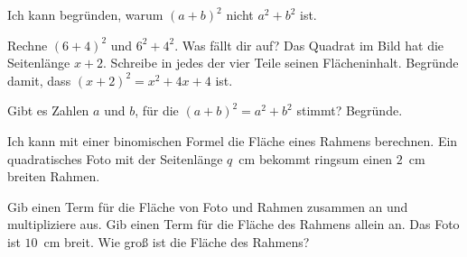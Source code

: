 \begin{aufgabe}{Ich kann begründen, warum $(a + b)^2$ nicht $a^2 + b^2$ ist.}
\begin{teile}
\teil Rechne $(6 + 4)^2$ und $6^2 + 4^2$. Was fällt dir auf?
\teil Das Quadrat im Bild hat die Seitenlänge $x + 2$. Schreibe in jedes der vier Teile seinen Flächeninhalt. Begründe damit, dass $(x + 2)^2 = x^2 + 4x + 4$ ist.
\end{teile}


\begin{teile}
\teil Gibt es Zahlen $a$ und $b$, für die $(a + b)^2 = a^2 + b^2$ stimmt? Begründe.
\end{teile}
\end{aufgabe}

\begin{aufgabe}{Ich kann mit einer binomischen Formel die Fläche eines Rahmens berechnen. Ein quadratisches Foto mit der Seitenlänge $q$~cm bekommt ringsum einen $2$~cm breiten Rahmen.}
\begin{teile}
\teil Gib einen Term für die Fläche von Foto und Rahmen zusammen an und multipliziere aus.
\teil Gib einen Term für die Fläche des Rahmens allein an.
\teil Das Foto ist $10$~cm breit. Wie groß ist die Fläche des Rahmens?
\end{teile}
\end{aufgabe}
